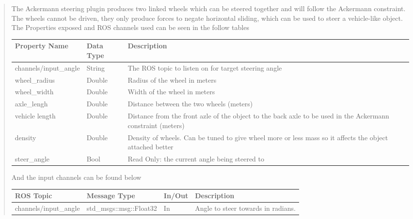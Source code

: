 \documentclass[letterpaper,10pt,english]{sphinxmanual}
\begin{document}
\begin{quote}

The Ackermann steering plugin produces two linked wheels which can be steered
together and will follow the Ackermann constraint. The wheels cannot be driven,
they only produce forces to negate horizontal sliding, which can be used to
steer a vehicle-like object. The Properties exposed and ROS channels used can be
seen in the follow tables


\begin{savenotes}\sphinxattablestart
\centering
\begin{tabulary}{\linewidth}[t]{|T|T|T|}
\hline
\sphinxstyletheadfamily 
Property Name
&\sphinxstyletheadfamily 
Data Type
&\sphinxstyletheadfamily 
Description
\\
\hline
channels/input\_angle
&
String
&
The ROS topic to listen on for target steering angle
\\
\hline
wheel\_radius
&
Double
&
Radius of the wheel in meters
\\
\hline
wheel\_width
&
Double
&
Width of the wheel in meters
\\
\hline
axle\_lengh
&
Double
&
Distance between the two wheels (meters)
\\
\hline
vehicle length
&
Double
&
Distance from the front azle of the object to the back axle to be used in the Ackermann constraint (meters)
\\
\hline
density
&
Double
&
Density of wheels. Can be tuned to give wheel more or less mass so it affects the object attached better
\\
\hline
steer\_angle
&
Bool
&
Read Only: the current angle being steered to
\\
\hline
\end{tabulary}
\par
\sphinxattableend\end{savenotes}

And the input channels can be found below


\begin{savenotes}\sphinxattablestart
\centering
\begin{tabulary}{\linewidth}[t]{|T|T|T|T|}
\hline
\sphinxstyletheadfamily 
ROS Topic
&\sphinxstyletheadfamily 
Message Type
&\sphinxstyletheadfamily 
In/Out
&\sphinxstyletheadfamily 
Description
\\
\hline
channels/input\_angle
&
std\_msgs::msg::Float32
&
In
&
Angle to steer towards in radians.
\\
\hline
\end{tabulary}
\par
\sphinxattableend\end{savenotes}
\end{quote}
\end{document}
